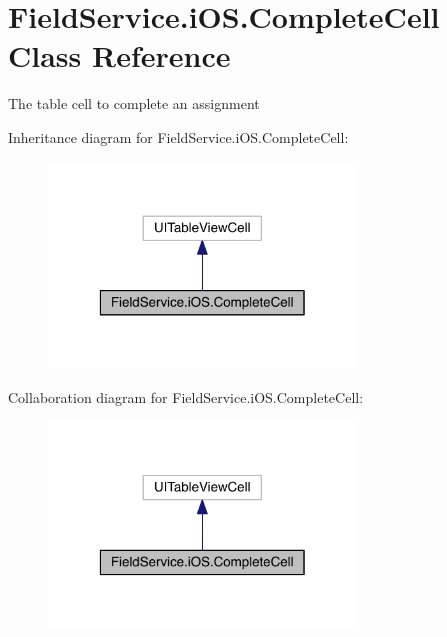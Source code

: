 \hypertarget{class_field_service_1_1i_o_s_1_1_complete_cell}{\section{Field\+Service.\+i\+O\+S.\+Complete\+Cell Class Reference}
\label{class_field_service_1_1i_o_s_1_1_complete_cell}
}


The table cell to complete an assignment  




Inheritance diagram for Field\+Service.\+i\+O\+S.\+Complete\+Cell\+:
\nopagebreak
\begin{figure}[H]
\begin{center}
\leavevmode
\includegraphics[width=232pt]{class_field_service_1_1i_o_s_1_1_complete_cell__inherit__graph}
\end{center}
\end{figure}


Collaboration diagram for Field\+Service.\+i\+O\+S.\+Complete\+Cell\+:
\nopagebreak
\begin{figure}[H]
\begin{center}
\leavevmode
\includegraphics[width=232pt]{class_field_service_1_1i_o_s_1_1_complete_cell__coll__graph}
\end{center}
\end{figure}
